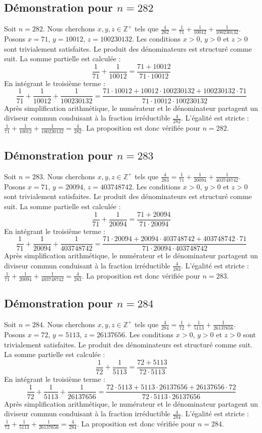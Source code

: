 \documentclass[11pt,a4paper]{article}
\begin{document}
\subsection{Démonstration pour $n = 282$}
Soit $n = 282$. Nous cherchons $x, y, z \in \mathbb{Z}^{+}$ tels que $\frac{4}{282} = \frac{1}{71} + \frac{1}{10012} + \frac{1}{100230132}$.
Posons $x = 71$, $y = 10012$, $z = 100230132$.
Les conditions $x > 0$, $y > 0$ et $z > 0$ sont trivialement satisfaites.
Le produit des dénominateurs est structuré comme suit. La somme partielle est calculée :
$$ \frac{1}{71} + \frac{1}{10012} = \frac{71+10012}{71 \cdot 10012} $$
En intégrant le troisième terme :
$$ \frac{1}{71} + \frac{1}{10012} + \frac{1}{100230132} = \frac{71 \cdot 10012 + 10012 \cdot 100230132 + 100230132 \cdot 71}{71 \cdot 10012 \cdot 100230132} $$
Après simplification arithmétique, le numérateur et le dénominateur partagent un diviseur commun conduisant à la fraction irréductible $\frac{4}{282}$.
L'égalité est stricte : $\frac{1}{71} + \frac{1}{10012} + \frac{1}{100230132} = \frac{4}{282}$.
La proposition est donc vérifiée pour $n = 282$.
\subsection{Démonstration pour $n = 283$}
Soit $n = 283$. Nous cherchons $x, y, z \in \mathbb{Z}^{+}$ tels que $\frac{4}{283} = \frac{1}{71} + \frac{1}{20094} + \frac{1}{403748742}$.
Posons $x = 71$, $y = 20094$, $z = 403748742$.
Les conditions $x > 0$, $y > 0$ et $z > 0$ sont trivialement satisfaites.
Le produit des dénominateurs est structuré comme suit. La somme partielle est calculée :
$$ \frac{1}{71} + \frac{1}{20094} = \frac{71+20094}{71 \cdot 20094} $$
En intégrant le troisième terme :
$$ \frac{1}{71} + \frac{1}{20094} + \frac{1}{403748742} = \frac{71 \cdot 20094 + 20094 \cdot 403748742 + 403748742 \cdot 71}{71 \cdot 20094 \cdot 403748742} $$
Après simplification arithmétique, le numérateur et le dénominateur partagent un diviseur commun conduisant à la fraction irréductible $\frac{4}{283}$.
L'égalité est stricte : $\frac{1}{71} + \frac{1}{20094} + \frac{1}{403748742} = \frac{4}{283}$.
La proposition est donc vérifiée pour $n = 283$.
\subsection{Démonstration pour $n = 284$}
Soit $n = 284$. Nous cherchons $x, y, z \in \mathbb{Z}^{+}$ tels que $\frac{4}{284} = \frac{1}{72} + \frac{1}{5113} + \frac{1}{26137656}$.
Posons $x = 72$, $y = 5113$, $z = 26137656$.
Les conditions $x > 0$, $y > 0$ et $z > 0$ sont trivialement satisfaites.
Le produit des dénominateurs est structuré comme suit. La somme partielle est calculée :
$$ \frac{1}{72} + \frac{1}{5113} = \frac{72+5113}{72 \cdot 5113} $$
En intégrant le troisième terme :
$$ \frac{1}{72} + \frac{1}{5113} + \frac{1}{26137656} = \frac{72 \cdot 5113 + 5113 \cdot 26137656 + 26137656 \cdot 72}{72 \cdot 5113 \cdot 26137656} $$
Après simplification arithmétique, le numérateur et le dénominateur partagent un diviseur commun conduisant à la fraction irréductible $\frac{4}{284}$.
L'égalité est stricte : $\frac{1}{72} + \frac{1}{5113} + \frac{1}{26137656} = \frac{4}{284}$.
La proposition est donc vérifiée pour $n = 284$.
\end{document}
